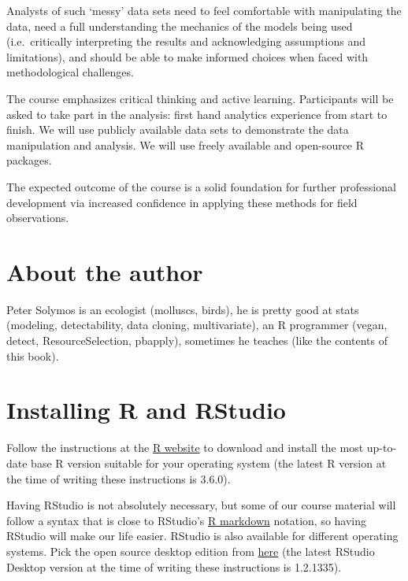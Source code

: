\documentclass[12pt,]{book}
\begin{document}
Analysts of such `messy' data sets need to feel comfortable
with manipulating the data, need a full understanding the mechanics of the
models being used (i.e.~critically interpreting the results and acknowledging
assumptions and limitations), and should be able to make informed choices when
faced with methodological challenges.

The course emphasizes critical thinking and active learning.
Participants will be asked to take part in the analysis:
first hand analytics experience from start to finish.
We will use publicly available data sets to demonstrate the data manipulation
and analysis. We will use freely available and open-source R packages.

The expected outcome of the course is a solid foundation for further
professional development via increased confidence in applying these methods
for field observations.

\hypertarget{about-the-author}{%
\section*{About the author}\label{about-the-author}}

Peter Solymos is an ecologist (molluscs, birds), he is pretty good at stats (modeling, detectability, data cloning, multivariate), an R programmer (vegan, detect, ResourceSelection, pbapply),
sometimes he teaches (like the contents of this book).

\hypertarget{installing-r-and-rstudio}{%
\section*{Installing R and RStudio}\label{installing-r-and-rstudio}}

Follow the instructions at the \href{http://cran.r-project.org}{R website} to download and install
the most up-to-date base R version suitable for your operating system (the latest R version at the time of writing these instructions is 3.6.0).

Having RStudio is not absolutely necessary, but some of our course material
will follow a syntax that is close to RStudio's \href{http://rmarkdown.rstudio.com/}{R markdown}
notation, so having RStudio will make our life easier. RStudio is also available for different operating systems. Pick the open source desktop edition from \href{http://www.rstudio.com/products/rstudio/download/}{here} (the latest RStudio Desktop version at the time of writing these instructions is 1.2.1335).
\end{document}
